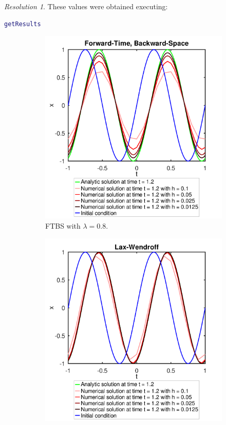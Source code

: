 \documentclass[10pt,a4paper]{article}
\theoremstyle{definition}
\theoremstyle{remark}
\newtheorem*{res}{Resolution}
\begin{document}
\begin{res}
  These values were obtained executing:
  \begin{lstlisting}[language=Matlab]
getResults
\end{lstlisting}
  \begin{figure}[!ht]
    \centering
    \begin{subfigure}{0.49\textwidth}
      \centering
      \includegraphics[width=\textwidth]{Images/ex2-ftbs.pdf}
      \caption{FTBS with $\lambda=0.8$.}
    \end{subfigure}\hfill
    \begin{subfigure}{0.49\textwidth}
      \centering
      \includegraphics[width=\textwidth]{Images/ex2-lw.pdf}

\end{subfigure}
\end{figure}
\end{res}
\end{document}
